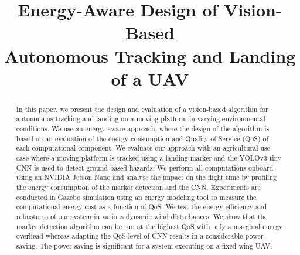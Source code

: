 \documentclass[conference]{IEEEtran}
\begin{document}
\title{Energy-Aware Design of Vision-Based\\Autonomous Tracking and Landing of a UAV} 

\author{
}

\maketitle


\begin{abstract}


In this paper, we present the design and evaluation of a
vision-based algorithm for autonomous tracking and landing on a moving platform 
in varying environmental conditions. %
%
We use an energy-aware approach, where the design of the algorithm is based on
an evaluation of the energy consumption and Quality of Service (QoS) of each computational component.
%
We evaluate our approach with an agricultural use case where
a moving platform is tracked using 
a landing marker %
and the YOLOv3-tiny CNN is used to detect ground-based hazards. We
perform all computations onboard using an NVIDIA Jetson Nano and analyse the impact on the flight time by profiling the energy consumption of the
marker detection and the CNN. Experiments are conducted in Gazebo simulation using an energy modeling tool to measure the computational energy cost as a function of QoS. %
We test the energy efficiency and robustness of our system in various dynamic wind disturbances. We show that the marker detection algorithm can be run at the highest QoS with only a marginal energy overhead whereas adapting the QoS level of CNN results in a considerable power saving. %
The
power saving is significant for a system executing on a fixed-wing UAV. %

\end{abstract}

%
\IEEEpeerreviewmaketitle
\end{document}
